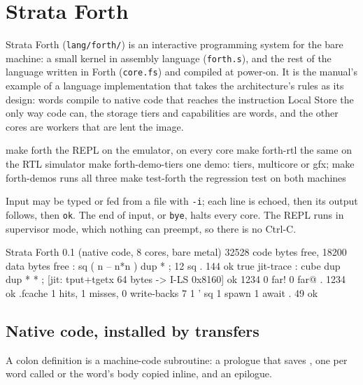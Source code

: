 \chapter{Strata Forth}\label{ch:forth}

Strata Forth (\texttt{lang/forth/}) is an interactive programming system for the bare machine: a small
kernel in assembly language (\texttt{forth.s}), and the rest of the language written in Forth
(\texttt{core.fs}) and compiled at power-on. It is the manual's example of a language implementation
that takes the architecture's rules as its design: words compile to native code that reaches the
instruction Local Store the only way code can, the storage tiers and capabilities are words, and the
other cores are workers that are lent the image.

\begin{shell}
make forth                 the REPL on the emulator, on every core
make forth-rtl             the same on the RTL simulator
make forth-demo-tiers      one demo: tiers, multicore or gfx; make forth-demos runs all three
make test-forth            the regression test on both machines
\end{shell}

Input may be typed or fed from a file with \texttt{-i}; each line is echoed, then its output follows,
then \texttt{ok}. The end of input, or \texttt{bye}, halts every core. The REPL runs in supervisor mode,
which nothing can preempt, so there is no Ctrl-C.

\begin{shell}
Strata Forth 0.1 (native code, 8 cores, bare metal) 32528 code bytes free, 18200 data bytes free
: sq ( n -- n*n ) dup * ;  12 sq . 144  ok
true jit-trace  : cube dup dup * * ; [jit: tput+tgetx 64 bytes -> I-LS 0x8160]  ok
1234 0 far!  0 far@ . 1234  ok
.fcache 1 hits, 1 misses, 0 write-backs
7 1 ' sq 1 spawn  1 await . 49  ok
\end{shell}

\section{Native code, installed by transfers}\label{sec:forth-jit}

A colon definition is a machine-code subroutine: a prologue that saves , one  per
word called or the word's body copied inline, and an epilogue.

